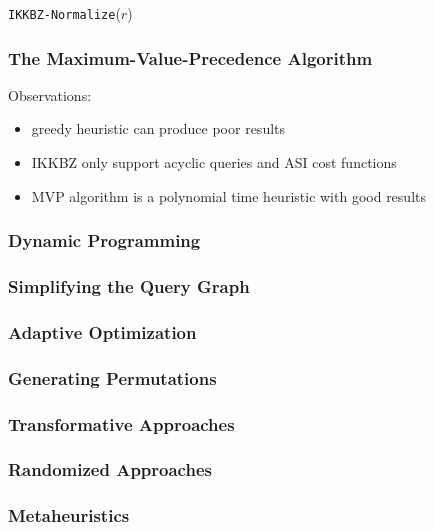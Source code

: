 \documentclass[11pt]{article}
\begin{document}
\begin{algorithm}
\caption{\texttt{IKKBZ-Normalize}(\(r\))}
\end{algorithm}
\subsubsection{The Maximum-Value-Precedence Algorithm}
\label{sec:org925e71c}
Observations:
\begin{itemize}
\item greedy heuristic can produce poor results
\item IKKBZ only support acyclic queries and ASI cost functions
\item MVP algorithm is a polynomial time heuristic with good results
\end{itemize}
\subsubsection{Dynamic Programming}
\label{sec:org0da0b00}
\subsubsection{Simplifying the Query Graph}
\label{sec:org44f40f3}
\subsubsection{Adaptive Optimization}
\label{sec:org4b65642}
\subsubsection{Generating Permutations}
\label{sec:org0c5e11d}
\subsubsection{Transformative Approaches}
\label{sec:org149b209}
\subsubsection{Randomized Approaches}
\label{sec:org979c245}
\subsubsection{Metaheuristics}
\label{sec:org28cbb66}
\end{document}
